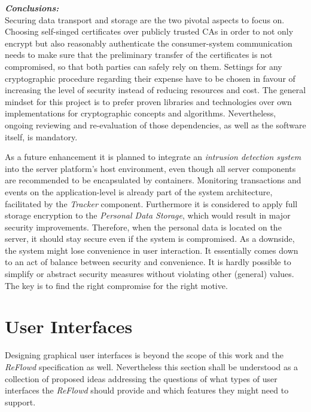 \documentclass[12pt,english,a4paper,titlepage,cleardoublepage=empty,dottedtoc]{report}
\begin{document}
\emph{\textbf{Conclusions:}} ~\\
Securing data transport and storage are the two pivotal aspects to focus
on. Choosing self-singed certificates over publicly trusted CAs in order
to not only encrypt but also reasonably authenticate the consumer-system
communication needs to make sure that the preliminary transfer of the
certificates is not compromised, so that both parties can safely rely on
them. Settings for any cryptographic procedure regarding their expense
have to be chosen in favour of increasing the level of security instead
of reducing resources and cost. The general mindset for this project is
to prefer proven libraries and technologies over own implementations for
cryptographic concepts and algorithms. Nevertheless, ongoing reviewing
and re-evaluation of those dependencies, as well as the software itself,
is mandatory.

As a future enhancement it is planned to integrate an \emph{intrusion
detection system} into the server platform's host environment, even
though all server components are recommended to be encapsulated by
containers. Monitoring transactions and events on the application-level
is already part of the system architecture, facilitated by the
\emph{Tracker} component. Furthermore it is considered to apply full
storage encryption to the \emph{Personal Data Storage}, which would
result in major security improvements. Therefore, when the personal data
is located on the server, it should stay secure even if the system is
compromised. As a downside, the system might lose convenience in user
interaction. It essentially comes down to an act of balance between
security and convenience. It is hardly possible to simplify or abstract
security measures without violating other (general) values. The key is
to find the right compromise for the right motive.

\section{User Interfaces}\label{user-interfaces}

Designing graphical user interfaces is beyond the scope of this work and
the \emph{ReFlowd} specification as well. Nevertheless this section
shall be understood as a collection of proposed ideas addressing the
questions of what types of user interfaces the \emph{ReFlowd} should
provide and which features they might need to support.
\end{document}
